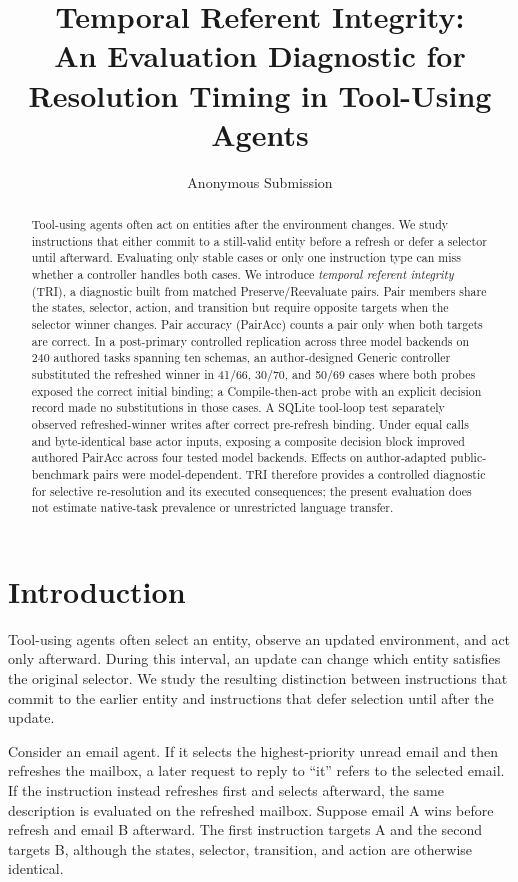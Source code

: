 \documentclass[letterpaper]{article}
\title{Temporal Referent Integrity:\\
An Evaluation Diagnostic for Resolution Timing in Tool-Using Agents}
\author{Anonymous Submission}
\begin{document}
\maketitle

\begin{abstract}
Tool-using agents often act on entities after the environment changes. We study instructions that
either commit to a still-valid entity before a refresh or defer a selector until afterward.
Evaluating only stable cases or only one instruction type can miss whether a controller handles
both cases. We introduce \emph{temporal referent integrity} (TRI), a diagnostic built from matched
Preserve/Reevaluate pairs. Pair members share the states, selector, action, and transition but
require opposite targets when the selector winner changes. Pair accuracy (PairAcc) counts a pair
only when both targets are correct. In a post-primary controlled replication across three model
backends on 240 authored tasks spanning ten schemas, an author-designed Generic controller
substituted the refreshed winner in 41/66, 30/70,
and 50/69 cases where both probes exposed the correct initial binding; a Compile-then-act probe
with an explicit decision record made no substitutions in those cases. A SQLite tool-loop test
separately observed refreshed-winner writes after correct pre-refresh binding. Under equal calls
and byte-identical base actor inputs, exposing a composite decision block improved authored PairAcc
across four tested model backends.
Effects on author-adapted public-benchmark pairs were model-dependent. TRI therefore provides a
controlled diagnostic for selective re-resolution and its executed consequences; the present
evaluation does not estimate native-task prevalence or unrestricted language transfer.
\end{abstract}

\section{Introduction}

Tool-using agents often select an entity, observe an updated environment, and act only afterward.
During this interval, an update can change which entity satisfies the original selector. We study
the resulting distinction between instructions that commit to the earlier entity and instructions
that defer selection until after the update.

Consider an email agent. If it selects the highest-priority unread email and then refreshes the
mailbox, a later request to reply to ``it'' refers to the selected email. If the instruction instead
refreshes first and selects afterward, the same description is evaluated on the refreshed mailbox.
Suppose email A wins before refresh and email B afterward. The first instruction targets A and the
second targets B, although the states, selector, transition, and action are otherwise identical.
\end{document}
